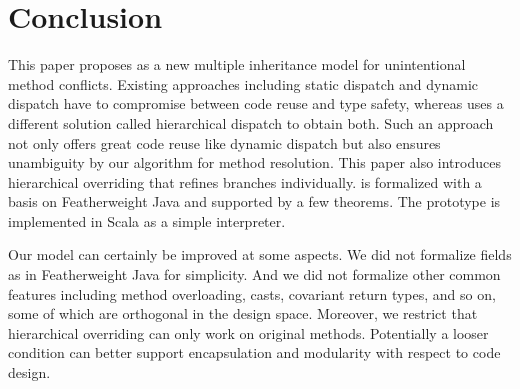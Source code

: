 \section{Conclusion}

This paper proposes \MIM{} as a new multiple inheritance model for unintentional method conflicts.
Existing approaches including static dispatch and dynamic dispatch have to compromise between code reuse
and type safety, whereas \MIM{} uses a different solution called hierarchical dispatch to obtain both.
Such an approach not only offers great code reuse like dynamic dispatch but also ensures unambiguity by
our algorithm for method resolution. This paper also introduces hierarchical overriding that refines branches individually.
\MIM{} is formalized with a basis on Featherweight Java and supported
by a few theorems. The prototype is implemented in Scala as a simple interpreter.

Our model can certainly be improved at some aspects. We did not formalize fields as in Featherweight Java for simplicity.
And we did not formalize other common features including
method overloading, casts, covariant return types, and so on, some of which are orthogonal in the design space. Moreover, we restrict that hierarchical overriding can only work on original methods. Potentially a looser condition can better support encapsulation and modularity with respect to code design.